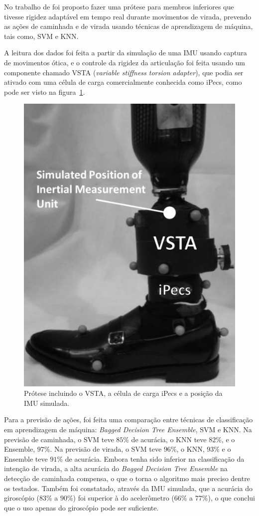 No trabalho de  foi proposto fazer uma prótese para membros inferiores que tivesse rigidez adaptável em tempo real durante movimentos de virada, prevendo as ações de caminhada e de virada usando técnicas de aprendizagem de máquina, tais como, SVM e KNN\@.

A leitura dos dados foi feita a partir da simulação de uma IMU usando captura de movimentos ótica, e o controle da rigidez da articulação foi feita usando um componente chamado VSTA (\textit{variable stiffness torsion adapter}), que podia ser ativado com uma célula de carga comercialmente conhecida como iPecs, como pode ser visto na figura~\ref{fig:rel_turnintent_1}.

\begin{figure}[ht]
	\caption{\label{fig:rel_turnintent_1}Prótese incluindo o VSTA, a célula de carga iPecs e a posição da IMU simulada.}
	\begin{center}
	    \includegraphics[width=.4\textwidth]{resources/rel_pew_turnintent_1}
	\end{center}
\end{figure}

Para a previsão de ações, foi feita uma comparação entre técnicas de classificação em aprendizagem de máquina: \textit{Bagged Decision Tree Ensemble}, SVM e KNN\@. Na previsão de caminhada, o SVM teve $85$\% de acurácia, o KNN teve $82$\%, e o Ensemble, $97$\%. Na previsão de virada, o SVM teve $96$\%, o KNN, $93$\% e o Ensemble teve $91$\% de acurácia. Embora tenha sido inferior na classificação da intenção de virada, a alta acurácia do \textit{Bagged Decision Tree Ensemble} na detecção de caminhada compensa, o que o torna o algoritmo mais preciso dentre os testados. Também foi constatado, através da IMU simulada, que a acurácia do giroscópio ($83$\% a $90$\%) foi superior à do acelerômetro ($66$\% a $77$\%), o que conclui que o uso apenas do giroscópio pode ser suficiente.

